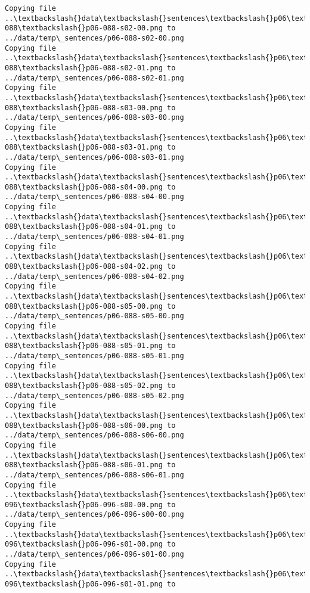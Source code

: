 \documentclass[11pt]{article}
\begin{document}
\begin{Verbatim}[commandchars=\\\{\}]
Copying file ..\textbackslash{}data\textbackslash{}sentences\textbackslash{}p06\textbackslash{}p06-088\textbackslash{}p06-088-s02-00.png to
../data/temp\_sentences/p06-088-s02-00.png
Copying file ..\textbackslash{}data\textbackslash{}sentences\textbackslash{}p06\textbackslash{}p06-088\textbackslash{}p06-088-s02-01.png to
../data/temp\_sentences/p06-088-s02-01.png
Copying file ..\textbackslash{}data\textbackslash{}sentences\textbackslash{}p06\textbackslash{}p06-088\textbackslash{}p06-088-s03-00.png to
../data/temp\_sentences/p06-088-s03-00.png
Copying file ..\textbackslash{}data\textbackslash{}sentences\textbackslash{}p06\textbackslash{}p06-088\textbackslash{}p06-088-s03-01.png to
../data/temp\_sentences/p06-088-s03-01.png
Copying file ..\textbackslash{}data\textbackslash{}sentences\textbackslash{}p06\textbackslash{}p06-088\textbackslash{}p06-088-s04-00.png to
../data/temp\_sentences/p06-088-s04-00.png
Copying file ..\textbackslash{}data\textbackslash{}sentences\textbackslash{}p06\textbackslash{}p06-088\textbackslash{}p06-088-s04-01.png to
../data/temp\_sentences/p06-088-s04-01.png
Copying file ..\textbackslash{}data\textbackslash{}sentences\textbackslash{}p06\textbackslash{}p06-088\textbackslash{}p06-088-s04-02.png to
../data/temp\_sentences/p06-088-s04-02.png
Copying file ..\textbackslash{}data\textbackslash{}sentences\textbackslash{}p06\textbackslash{}p06-088\textbackslash{}p06-088-s05-00.png to
../data/temp\_sentences/p06-088-s05-00.png
Copying file ..\textbackslash{}data\textbackslash{}sentences\textbackslash{}p06\textbackslash{}p06-088\textbackslash{}p06-088-s05-01.png to
../data/temp\_sentences/p06-088-s05-01.png
Copying file ..\textbackslash{}data\textbackslash{}sentences\textbackslash{}p06\textbackslash{}p06-088\textbackslash{}p06-088-s05-02.png to
../data/temp\_sentences/p06-088-s05-02.png
Copying file ..\textbackslash{}data\textbackslash{}sentences\textbackslash{}p06\textbackslash{}p06-088\textbackslash{}p06-088-s06-00.png to
../data/temp\_sentences/p06-088-s06-00.png
Copying file ..\textbackslash{}data\textbackslash{}sentences\textbackslash{}p06\textbackslash{}p06-088\textbackslash{}p06-088-s06-01.png to
../data/temp\_sentences/p06-088-s06-01.png
Copying file ..\textbackslash{}data\textbackslash{}sentences\textbackslash{}p06\textbackslash{}p06-096\textbackslash{}p06-096-s00-00.png to
../data/temp\_sentences/p06-096-s00-00.png
Copying file ..\textbackslash{}data\textbackslash{}sentences\textbackslash{}p06\textbackslash{}p06-096\textbackslash{}p06-096-s01-00.png to
../data/temp\_sentences/p06-096-s01-00.png
Copying file ..\textbackslash{}data\textbackslash{}sentences\textbackslash{}p06\textbackslash{}p06-096\textbackslash{}p06-096-s01-01.png to

\end{Verbatim}
\end{document}
